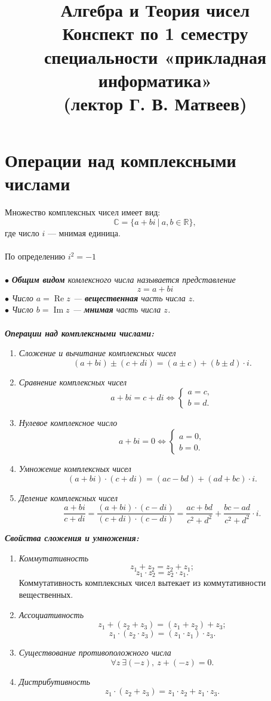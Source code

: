 \documentclass[a4paper, 12pt]{article}
\title{\vspace{6.5cm}\textbf{\Huge{Алгебра и Теория чисел}}\\Конспект по 1 семестру 
специальности «прикладная информатика»\\(лектор Г. В. Матвеев)}
\date{}
\newcommand{\R}{\mathbb{R}}
\renewcommand{\C}{\mathbb{C}}
\renewcommand{\Re}{\operatorname{Re}}
\renewcommand{\Im}{\operatorname{Im}}
\begin{document}
\maketitle
\newpage
\tableofcontents{}
\newpage

\section{Операции над комплексными числами}
Множество комплексных чисел имеет вид:
$$\C=\{a+bi \: |\ a,b \in \R \},$$
где число $i$ --- мнимая единица.\\\\
По определению $i^2=-1$\\\\
$\bullet$ \textit{\textbf{Общим видом} комлексного числа называется представление}
$$z = a + bi$$
$\bullet$ \textit{Число $a = \Re z$ --- \textbf{вещественная} часть числа $z$}.\\
$\bullet$ \textit{Число $b = \Im z$ --- \textbf{мнимая} часть числа $z$.}\\\\
\textit{\textbf{Операции над комплексными числами:}}\\
\begin{enumerate}
    \item \textit{Сложение и вычитание комплексных чисел}
    $$(a+bi) \pm (c+di) = (a \pm c) + (b \pm d)\cdot i.$$
    \item \textit{Сравнение комплексных чисел}
    $$a+bi = c+di \Longleftrightarrow \begin{cases} a = c,\\ b = d. \end{cases}$$
    \item \textit{Нулевое комплексное число}
    $$a + bi = 0 \Longleftrightarrow \begin{cases} a = 0,\\ b = 0. \end{cases}$$
    \item \textit{Умножение комплексных чисел}
    $$(a+bi)\cdot (c+di)=(ac-bd)+(ad+bc)\cdot i.$$
    \item \textit{Деление комплексных чисел}
    $$\frac{a+bi}{c+di} = \frac {(a+bi)\cdot (c-di)}{(c+di)\cdot (c-di)} = \frac {ac+bd}{c^2+d^2}+\frac{bc-ad}{c^2+d^2}\cdot i.$$
\end{enumerate}
\textit{\textbf{Свойства сложения и умножения:}}
\begin{enumerate}
    \item \textit{Коммутативность}
    $$z_1 + z_2 = z_2 + z_1;$$
    $$z_1\cdot z_2=z_2\cdot z_1.$$
    Коммутативность комплексных чисел вытекает из коммутативности вещественных.
    \item \textit{Ассоциативность}
    $$z_1 + (z_2 + z_3) = (z_1 + z_2) + z_3;$$
    $$z_1\cdot (z_2\cdot z_3)=(z_1\cdot z_1)\cdot z_3.$$
    \item \textit{Существование противоположного числа}
    $$\forall z\ \exists (-z), \: z+(-z)=0.$$
    \item \textit{Дистрибутивность}
    $$z_1\cdot (z_2+z_3)=z_1\cdot z_2+z_1\cdot z_3.$$
\end{enumerate}
\end{document}
